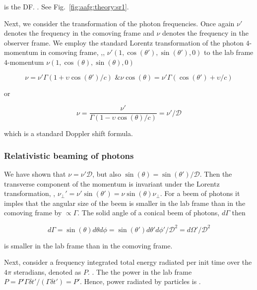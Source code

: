 is the \ac{DF}. 
.
See Fig.~\ref{fig:aafg:theory:sr1}.

Next, we consider the transformation of the photon frequencies. 
Once again $\nu'$ denotes the frequency in the comoving frame and $\nu$ denotes the frequency in the observer frame. 
We employ the standard Lorentz transformation of the photon $4$-momentum in comoving frame, \eg,, $\nu'(1, \cos(\theta'), \sin(\theta'),0)$ to the lab frame $4$-momentum $\nu(1, \cos(\theta), \sin(\theta), 0)$

\begin{equation}
\nu = \nu' \Gamma(1+\upsilon \cos(\theta')/c) \text{ \& } \nu\cos(\theta) = \nu' \Gamma (\cos(\theta') + \upsilon/c)
\end{equation}

or 

\begin{equation}
\nu = \frac{\nu'}{\Gamma (1 - \upsilon\cos(\theta)/c)} = \nu' / \mathcal{D}
\end{equation}

which is a standard Doppler shift formula.


\subsubsection{Relativistic beaming of photons}

We have shown that $\nu = \nu' \mathcal{D}$, but also $\sin(\theta) = \sin(\theta')/\mathcal{D}$. Then the transverse component of the momentum is invariant under the Lorentz transformation, \eg, $\nu_{\perp}' = \nu'\sin(\theta') = \nu\sin(\theta) \nu_{\perp}$. 
For a beem of photons it imples that the angular size of the beem is smaller in the lab frame than in the comoving frame by $\propto \Gamma$.
The solid angle of a conical beem of photons, $d\Gamma$ then 

\begin{equation}
d\Gamma = \sin(\theta)d\theta d\phi = \sin(\theta') d\theta' d\phi' / \mathcal{D}^2 = d\Omega'/\mathcal{D}^2
\end{equation}

is smaller in the lab frame than in the comoving frame.

Next, consider a frequency integrated total energy radiated per init time over the $4\pi$ steradians, denoted as $P$. 
 .
The the power in the lab frame $P = P'\Gamma\delta t'/(\Gamma\delta t') = P'$. 
Hence, power radiated by particles is .


